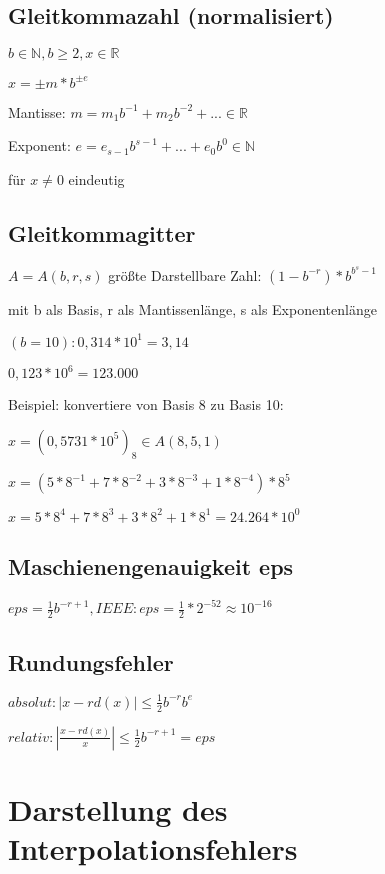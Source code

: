 \documentclass[12pt,a4paper]{article} %
\begin{document}
	\subsection{Gleitkommazahl (normalisiert)}
	
	$b \in \mathbb{N}, b \ge 2, x \in \mathbb{R}$
	
	$x = \pm m * b^{\pm e}$
	
	Mantisse: $m = m_1b^{-1} + m_2b^{-2} + ... \in \mathbb{R}$
	
	Exponent: $e = e_{s-1}b^{s-1} + ... + e_0b^0 \in \mathbb{N}$
	
	für $x \ne 0$ eindeutig
	
	\subsection{Gleitkommagitter}
	
	$A = A(b, r, s)$ größte Darstellbare Zahl: $(1 - b^{-r})*b^{b^s-1}$
	
	mit b als Basis, r als Mantissenlänge, s als Exponentenlänge
	
	$(b = 10): 0,314 * 10^1 = 3,14$
	
	$0,123 * 10^6 = 123.000$
	
	Beispiel: konvertiere von Basis 8 zu Basis 10:
	
	$x = (0,5731 * 10^5)_8 \in A(8, 5, 1)$
	
	$x = (5 * 8^{-1} + 7 * 8^{-2} + 3 * 8^{-3} + 1 * 8^{-4}) * 8^5$
	
	$x = 5 * 8^4 + 7 * 8^3 + 3 * 8^2 + 1 * 8^1 = 24.264 * 10^0$
	
	\subsection{Maschienengenauigkeit eps}
	
	$eps = \frac{1}{2}b^{-r + 1}, IEEE: eps = \frac{1}{2} * 2^{-52} \approx 10^{-16}$
	
	\subsection{Rundungsfehler}
	
	$absolut: |x - rd(x)| \le \frac{1}{2}b^{-r}b^e$
	
	$relativ: |\frac{x - rd(x)}{x}| \le \frac{1}{2}b^{-r+1} = eps$
	
	\newpage
	
	\section{Darstellung des Interpolationsfehlers}
	
\end{document}
